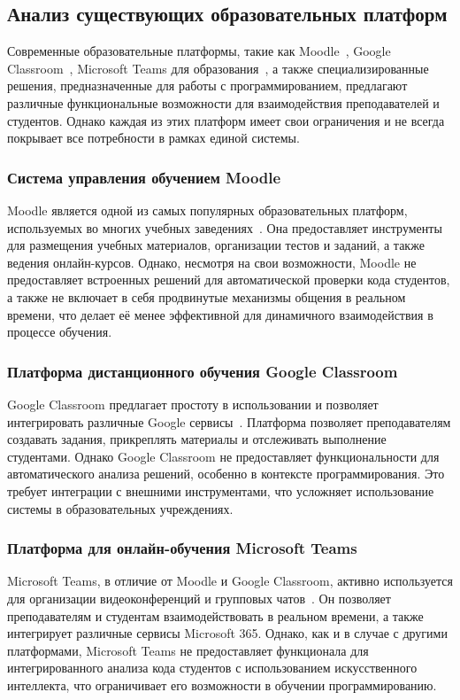 \subsection{Анализ существующих образовательных платформ}

Современные образовательные платформы, такие как Moodle~\cite{moodle_docs}, Google Classroom~\cite{google_classroom}, Microsoft Teams для образования~\cite{microsoft_teams_education}, а также специализированные решения, предназначенные для работы с программированием, предлагают различные функциональные возможности для взаимодействия преподавателей и студентов. Однако каждая из этих платформ имеет свои ограничения и не всегда покрывает все потребности в рамках единой системы.

\subsubsection{Система управления обучением Moodle}
Moodle является одной из самых популярных образовательных платформ, используемых во многих учебных заведениях~\cite{moodle_docs}. Она предоставляет инструменты для размещения учебных материалов, организации тестов и заданий, а также ведения онлайн-курсов. Однако, несмотря на свои возможности, Moodle не предоставляет встроенных решений для автоматической проверки кода студентов, а также не включает в себя продвинутые механизмы общения в реальном времени, что делает её менее эффективной для динамичного взаимодействия в процессе обучения.

\subsubsection{Платформа дистанционного обучения Google Classroom}
Google Classroom предлагает простоту в использовании и позволяет интегрировать различные Google сервисы~\cite{google_classroom}. Платформа позволяет преподавателям создавать задания, прикреплять материалы и отслеживать выполнение студентами. Однако Google Classroom не предоставляет функциональности для автоматического анализа решений, особенно в контексте программирования. Это требует интеграции с внешними инструментами, что усложняет использование системы в образовательных учреждениях.

\subsubsection{Платформа для онлайн-обучения Microsoft Teams}
Microsoft Teams, в отличие от Moodle и Google Classroom, активно используется для организации видеоконференций и групповых чатов~\cite{microsoft_teams_education}. Он позволяет преподавателям и студентам взаимодействовать в реальном времени, а также интегрирует различные сервисы Microsoft 365. Однако, как и в случае с другими платформами, Microsoft Teams не предоставляет функционала для интегрированного анализа кода студентов с использованием искусственного интеллекта, что ограничивает его возможности в обучении программированию.

